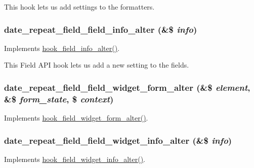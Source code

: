 This hook lets us add settings to the formatters. \hypertarget{date__repeat__field_8module_ad5c963b8f4121e98d8f418fa7d0ae567}{
\subsubsection[{date\_\-repeat\_\-field\_\-field\_\-info\_\-alter}]{\setlength{\rightskip}{0pt plus 5cm}date\_\-repeat\_\-field\_\-field\_\-info\_\-alter (\&\$ {\em info})}}
\label{date__repeat__field_8module_ad5c963b8f4121e98d8f418fa7d0ae567}
Implements \hyperlink{group__field__types_ga62d5e308d07e62b096d13714ae42335f}{hook\_\-field\_\-info\_\-alter()}.

This Field API hook lets us add a new setting to the fields. \hypertarget{date__repeat__field_8module_a5914caf7a2db79c7439116ac08fc9637}{
\subsubsection[{date\_\-repeat\_\-field\_\-field\_\-widget\_\-form\_\-alter}]{\setlength{\rightskip}{0pt plus 5cm}date\_\-repeat\_\-field\_\-field\_\-widget\_\-form\_\-alter (\&\$ {\em element}, \/  \&\$ {\em form\_\-state}, \/  \$ {\em context})}}
\label{date__repeat__field_8module_a5914caf7a2db79c7439116ac08fc9637}
Implements \hyperlink{group__field__widget_gaca9d517ab0584fa2428779d8aa24a441}{hook\_\-field\_\-widget\_\-form\_\-alter()}. \hypertarget{date__repeat__field_8module_a234852fc42f6e6c0e7483ffcdbcbf958}{
\subsubsection[{date\_\-repeat\_\-field\_\-field\_\-widget\_\-info\_\-alter}]{\setlength{\rightskip}{0pt plus 5cm}date\_\-repeat\_\-field\_\-field\_\-widget\_\-info\_\-alter (\&\$ {\em info})}}
\label{date__repeat__field_8module_a234852fc42f6e6c0e7483ffcdbcbf958}
Implements \hyperlink{group__field__widget_ga2e74ac1b4b45e9f31b58b86d01892e7e}{hook\_\-field\_\-widget\_\-info\_\-alter()}.

